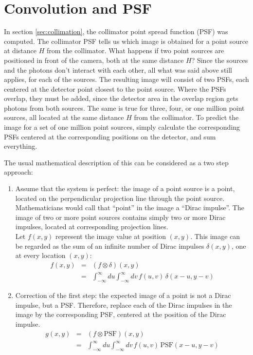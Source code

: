 \newpage
\section{Convolution and PSF} \label{app:convolution}
In section \ref{sec:collimation}, the collimator point spread function (PSF)
was computed. The collimator PSF tells us which image is obtained for a point
source at distance $H$ from the collimator. What happens if two point sources
are positioned in front of the camera, both at the same distance $H$? Since
the sources and the photons don't interact with each other, all what was said
above still applies, for each of the sources. The resulting image will consist
of two PSFs, each centered at the detector point closest to the point
source. Where the PSFs overlap, they must be added, since the detector area
in the overlap region gets photons from both sources. The same is true for
three, four, or one million point sources, all located at the same distance
$H$ from the collimator. To predict the image for a set of one million point
sources, simply calculate the corresponding PSFs centered at the
corresponding positions on the detector, and sum everything.

The usual mathematical description of this can be considered as a two step
approach:
\begin{enumerate}
\item
Assume that the system is perfect: the image of a point source is a point,
located on the perpendicular projection line through the point source.
Mathematicians would call that ``point'' in the image a ``Dirac impulse''.
The image of two or more point sources contains simply two or more Dirac
impulses, located at corresponding projection lines.\\
%
Let $f(x,y)$ represent the image value at position $(x,y)$. This image
can be regarded as the sum of an infinite number of Dirac impulses
$\delta(x,y)$, one at every location $(x,y)$:
\begin{align}
f(x,y) & = & (f \otimes \delta) (x,y)\\
       & = & \int_{-\infty}^{\infty} du \int_{-\infty}^{\infty} dv \, f(u,v) \, \delta(x-u, y-v)
\end{align}

\item
Correction of the first step: the expected image of a point is not a Dirac
impulse, but a PSF. Therefore, replace each of the Dirac impulses in the image
by the corresponding PSF, centered at the position of the Dirac impulse.
\begin{align}
g(x,y) & = & (f \otimes \mbox{PSF}) (x,y)\\
       & = & \int_{-\infty}^{\infty} du \int_{-\infty}^{\infty} dv \, f(u,v) \, \mbox{PSF}(x-u, y-v)
\end{align}
\end{enumerate}

